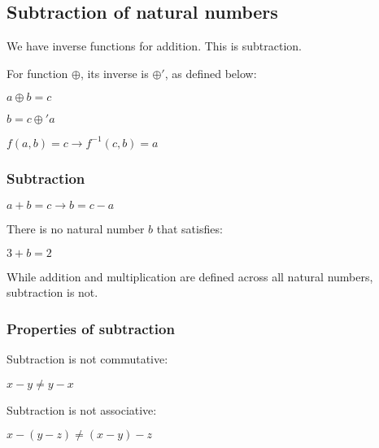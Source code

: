 \subsection{Subtraction of natural numbers}

We have inverse functions for addition. This is subtraction.

For function \(\oplus\), its inverse is \(\oplus' \), as defined below:

$a\oplus b=c$

$b=c\oplus 'a$

$f(a,b)=c\rightarrow f^{-1}(c,b)=a$

\subsubsection{Subtraction}

$a+b=c\rightarrow b=c-a$

There is no natural number \(b\) that satisfies:

$3+b=2$

While addition and multiplication are defined across all natural numbers, subtraction is not.
\subsubsection{Properties of subtraction}

Subtraction is not commutative:

$x-y\ne y-x$

Subtraction is not associative:

$x-(y-z)\ne (x-y)-z$

